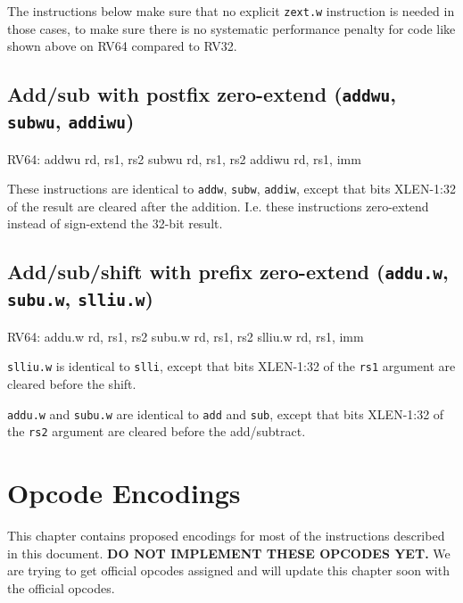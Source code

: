 The instructions below make sure that no explicit {\tt zext.w} instruction
is needed in those cases, to make sure there is no systematic performance
penalty for code like shown above on RV64 compared to RV32.

\subsection{Add/sub with postfix zero-extend ({\tt addwu}, {\tt subwu}, {\tt addiwu})}

\begin{rvb}
  RV64:
    addwu rd, rs1, rs2
    subwu rd, rs1, rs2
    addiwu rd, rs1, imm
\end{rvb}

These instructions are identical to {\tt addw}, {\tt subw}, {\tt addiw},
except that bits XLEN-1:32 of the result are cleared after the addition. I.e.
these instructions zero-extend instead of sign-extend the 32-bit result.



\subsection{Add/sub/shift with prefix zero-extend ({\tt addu.w}, {\tt subu.w}, {\tt slliu.w})}

\begin{rvb}
  RV64:
    addu.w rd, rs1, rs2
    subu.w rd, rs1, rs2
    slliu.w rd, rs1, imm
\end{rvb}

{\tt slliu.w} is identical to {\tt slli}, except that bits XLEN-1:32 of the
{\tt rs1} argument are cleared before the shift.

{\tt addu.w} and {\tt subu.w} are identical to {\tt add} and {\tt sub}, except
that bits XLEN-1:32 of the {\tt rs2} argument are cleared before the add/subtract.





\section{Opcode Encodings}
\label{opcodes}

This chapter contains proposed encodings for most of the instructions described
in this document. {\bf DO NOT IMPLEMENT THESE OPCODES YET.} We are trying to get
official opcodes assigned and will update this chapter soon with the official
opcodes.

